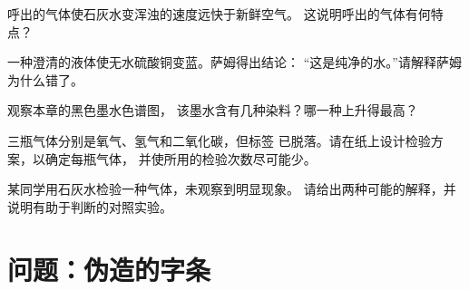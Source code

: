 \begin{exercise}[$\star\star$]\label{exo:g7:identifying-substances:8}
呼出的气体使石灰水变浑浊的速度远快于新鲜空气。
这说明呼出的气体有何特点？
\end{exercise}

\begin{exercise}[$\star\star$]\label{exo:g7:identifying-substances:9}
一种澄清的液体使无水硫酸铜变蓝。萨姆得出结论：
“这是纯净的水。”请解释萨姆为什么错了。
\end{exercise}

\begin{exercise}[$\star\star$]\label{exo:g7:identifying-substances:10}
观察本章的黑色墨水色谱图，
该墨水含有几种染料？哪一种上升得最高？
\end{exercise}

\begin{exercise}[$\star\star\star$]\label{exo:g7:identifying-substances:11}
三瓶气体分别是氧气、氢气和二氧化碳，但标签
已脱落。请在纸上设计检验方案，以确定每瓶气体，
并使所用的检验次数尽可能少。
\end{exercise}

\begin{exercise}[$\star\star\star$]\label{exo:g7:identifying-substances:12}
某同学用石灰水检验一种气体，未观察到明显现象。
请给出两种可能的解释，并说明有助于判断的对照实验。
\end{exercise}

\section{问题：伪造的字条}

